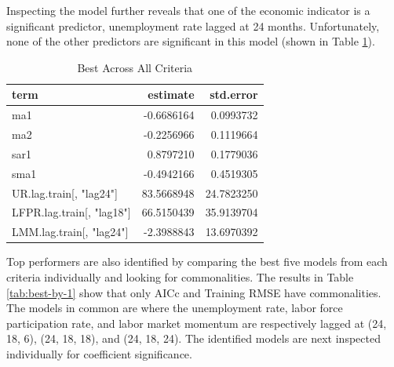 \documentclass[12pt,letterpaper,toc=flat,oneside]{report}
\theoremstyle{definition}
\theoremstyle{definition}
\theoremstyle{definition}
\theoremstyle{remark}
\begin{document}
Inspecting the model further reveals that one of the economic indicator
is a significant predictor, unemployment rate lagged at 24 months.
Unfortunately, none of the other predictors are significant in this
model (shown in Table \ref{tab:best-by-all-1}).

\begin{table}[!h]

\caption{\label{tab:best-by-all-1}Best Across All Criteria}
\centering
\begin{tabular}[t]{lrr}
\toprule
\bfseries{term} & \bfseries{estimate} & \bfseries{std.error}\\
\midrule
ma1 & -0.6686164 & 0.0993732\\
ma2 & -0.2256966 & 0.1119664\\
sar1 & 0.8797210 & 0.1779036\\
sma1 & -0.4942166 & 0.4519305\\
UR.lag.train[, "lag24"] & 83.5668948 & 24.7823250\\
\addlinespace
LFPR.lag.train[, "lag18"] & 66.5150439 & 35.9139704\\
LMM.lag.train[, "lag24"] & -2.3988843 & 13.6970392\\
\bottomrule
\end{tabular}
\end{table}

Top performers are also identified by comparing the best five models
from each criteria individually and looking for commonalities. The
results in Table \ref{tab:best-by-1} show that only AICc and Training
RMSE have commonalities. The models in common are where the unemployment
rate, labor force participation rate, and labor market momentum are
respectively lagged at (24, 18, 6), (24, 18, 18), and (24, 18, 24). The
identified models are next inspected individually for coefficient
significance.
\end{document}
